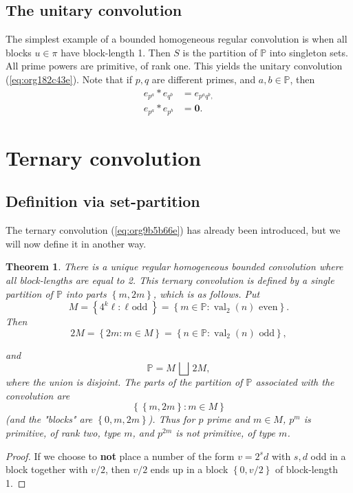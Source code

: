 \documentclass[12pt]{article}
\theoremstyle{definition}
\theoremstyle{remark}
\theoremstyle{plain}
\newtheorem{theorem}[lemma]{Theorem}
\newcommand{\set}[1]{\left\{{#1}\right\}}
\newcommand\setsuchas[2]{\left\{{#1}:{#2}\right\}}
\newcommand{\NNp}{{\mathbb{P}}}
\newcommand{\val}{\operatorname{val}}
\begin{document}
\subsection{The unitary convolution}
\label{sec:org1cfd398}
The simplest example of a bounded homogeneous regular convolution is when all blocks \(u \in \pi\) have
block-length 1. Then \(S\) is the partition
of \(\NNp\) into singleton sets. All prime powers are primitive, of rank one. This yields the
unitary convolution (\ref{eq:org182c43e}).
Note that if \(p,q\) are different primes, and \(a,b \in \NNp\), then
\begin{equation}
\label{eq:orge654700}
  \begin{split}
    e_{p^{a}} * e_{q^{b}} & = e_{p^a q^b,} \\
    e_{p^{a}} * e_{p^{b}} & = \mathbf{0}.    
  \end{split}
\end{equation}
\section{Ternary convolution}
\label{sec:orgeaefe31}
\subsection{Definition via set-partition}
\label{sec:orga2923a5}
The ternary convolution (\ref{eq:org9b5b66e}) has already been introduced,
but we will now define it in another way.

\begin{theorem}
There is a unique regular homogeneous bounded convolution where all block-lengths
are equal to 2. This \emph{ternary convolution} is defined by a single partition
of \(\NNp\) into parts \(\set{m,2m}\), which is as follows. Put 
\begin{equation}
\label{eq:org002fe6e}
M =\setsuchas{4^{k} \ell}{\ell \text{ odd}} = \setsuchas{m \in \NNp}{\val_{2}(n) \text{ even}}.
\end{equation}
Then
\[ 2M = \setsuchas{2m}{m \in M} = \setsuchas{n \in \NNp}{\val_{2}(n) \text{ odd}}, \]

and
\[\NNp = M \, \bigsqcup \, 2M,\] where the union is disjoint.
The parts of the partition of \(\NNp\) associated with the convolution are
\begin{equation}
\label{eq:org7573984}
\setsuchas{\set{m,2m}}{m \in M}
\end{equation}
(and the "blocks" are \(\set{0,m,2m}\)). Thus for \(p\) prime and \(m \in M\), \(p^{m}\) is primitive, of
rank two, type \(m\), and \(p^{2m}\) is not primitive, of type \(m\).
\label{org8fb3da9}
\end{theorem}
\begin{proof}
If we choose to \textbf{not} place a number of the form \(v=2^{s}d\) with \(s,d\) odd
in a block together with \(v/2\), then \(v/2\) ends up in a block \(\set{0,v/2}\) of
block-length 1.
\end{proof}
\end{document}
